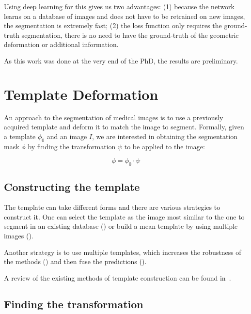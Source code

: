 Using deep learning for this gives us two advantages: (1) because the network learns on a database of images and does not have to be retrained on new images, the segmentation is extremely fast; (2) the loss function only requires the ground-truth segmentation, there is no need to have the ground-truth of the geometric deformation or additional information.

As this work was done at the very end of the PhD, the results are preliminary.

\section{Template Deformation}
\label{sec:seg_biblio}

An approach to the segmentation of medical images is to use a previously acquired template and deform it to match the image to segment. Formally, given a template $\phi_0$ and an image $I$, we are interested in obtaining the segmentation mask $\phi$ by finding the transformation $\psi$ to be applied to the image:

\begin{equation}
    \phi = \phi_0 \cdot \psi %
\end{equation}

\subsection{Constructing the template}

The template can take different forms and there are various strategies to construct it. One can select the template as the image most similar to the one to segment in an existing database (\textcite{commowick2007MICCAI}) or build a mean template by using multiple images (\textcite{joshi2004}).

Another strategy is to use multiple templates, which increases the robustness of the methods (\textcite{heckemann2006}) and then fuse the predictions (\textcite{warfield2004}). 

A review of the existing methods of template construction can be found in~\textcite{cabezas2011}.

\subsection{Finding the transformation}

